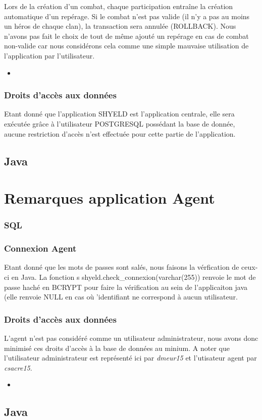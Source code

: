 \documentclass{article}[12pt]
\newcommand{\SQLcode}[2]{
	\begin{itemize}
		\item[]
	\end{itemize}
}
\begin{document}
	Lors de la création d'un combat, chaque participation entraîne la création automatique d'un repérage. Si le combat n'est pas valide (il n'y a pas au moins un héros de chaque clan), la transaction sera annulée (ROLLBACK). Nous n'avons pas fait le choix de tout de même ajouté un repérage en cas de combat non-valide car nous considérons cela comme une simple mauvaise utilisation de l'application par l'utilisateur.
	\SQLcode{triggerReperage}{Trigger de création automatique de repérage en cas d'insertion d'une participation}
	
	
	\subsubsection{Droits d'accès aux données}
	Etant donné que l'application SHYELD est l'application centrale, elle sera exécutée grâce à l'utilisateur POSTGRESQL possédant la base de donnée, aucune restriction d'accès n'est effectuée pour cette partie de l'application.
	\subsection{Java}
	
	
	\section{Remarques application Agent}
	\label{agent}
	\subsubsection{SQL}
	
	\subsubsection{Connexion Agent}
	Etant donné que les mots de passes sont salés, nous faisons la vérfication de ceux-ci en Java. La fonction s shyeld.check\_connexion(varchar(255)) renvoie le mot de passe haché en BCRYPT pour faire la vérification au sein de l'applicaiton java (elle renvoie NULL en cas où 'identifiant ne correspond à aucun utilisateur.
	\subsubsection{Droits d'accès aux données}
	L'agent n'est pas considéré comme un utilisateur administrateur, nous avons donc minimisé ces droits d'accès à la base de données au minium. A noter que l'utilisateur administrateur est représenté ici par \textit{dmeur15} et l'utisateur agent par \textit{csacre15}.
	\SQLcode{grant}{Droits d'accès à la base de données pour un agent}
	\subsection{Java}
	
\end{document}
